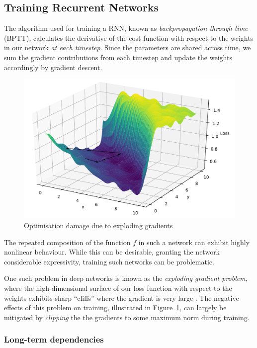 \documentclass[12pt,a4paper,twoside,openright]{report}
\begin{document}
\subsection{Training Recurrent Networks}\label{sec:rnn-train}

The algorithm used for training a RNN, known as \emph{backpropagation through
time} (BPTT), calculates the derivative of the cost function with respect to the
weights in our network \emph{at each timestep}. Since the parameters are shared
across time, we sum the gradient contributions from each timestep and update the
weights accordingly by gradient descent.

\begin{figure}[H]
\centering
\includegraphics[width=400pt]{figs/exploding_gradients.pdf}
\caption{Optimisation damage due to exploding gradients}
\label{fig:exploding-grad}
\end{figure}

The repeated composition of the function $f$ in such a network can exhibit
highly nonlinear behaviour. While this can be desirable, granting the network
considerable expressivity, training such networks can be problematic. 

One such problem in deep networks is known as the \emph{exploding gradient
problem}, where the high-dimensional surface of our loss function with respect
to the weights exhibits sharp ``cliffs'' where the gradient is very large
\cite{Goodfellow-et-al-2016}. The negative effects of this problem on training,
illustrated in Figure~\ref{fig:exploding-grad}, can largely be mitigated by
\emph{clipping} the the gradients to some maximum norm during training.

\subsubsection{Long-term dependencies}
\end{document}
